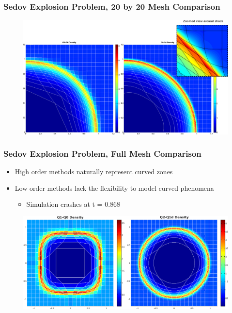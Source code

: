 \documentclass[8pt,xcolor=svgnames]{beamer}
\begin{document}
\begin{frame}
 \frametitle{Sedov Explosion Problem, 20 by 20 Mesh Comparison}
 \begin{figure}[h!]
  \centering
  \includegraphics[width=1.0\textwidth,keepaspectratio=true]{./Images/SedovCompare.png}
  \end{figure}
\end{frame}

\begin{frame}
 \frametitle{Sedov Explosion Problem, Full Mesh Comparison}
\begin{itemize}
 \item High order methods naturally represent curved zones
 \item Low order methods lack the flexibility to model curved phenomena
 \begin{itemize}
  \item Simulation crashes at t = 0.868
 \end{itemize}
\end{itemize}

 \begin{figure}[h!]
  \centering
  \includegraphics[width=1.0\textwidth,keepaspectratio=true]{./Images/SedovFullMeshCompare.png}
  \end{figure}
\end{frame}
\end{document}

